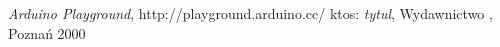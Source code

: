 \newpage
\begin{thebibliography}{99}
\emph{Arduino Playground},
http://playground.arduino.cc/
 ktos:
\emph{tytul},
Wydawnictwo , Poznań 2000
\end{thebibliography}